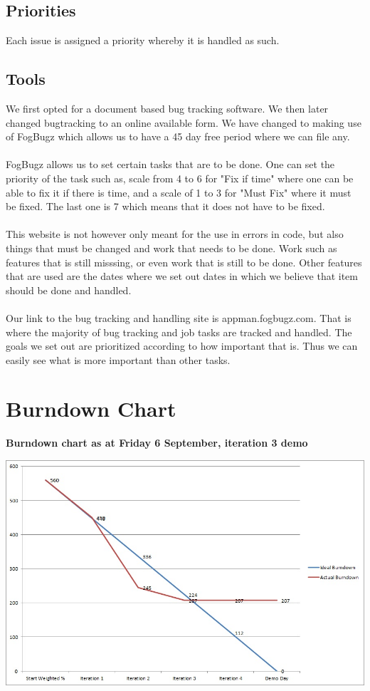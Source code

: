 \documentclass[a4paper,12pt,final]{article}
\begin{document}
\subsection{Priorities}
Each issue is assigned a priority whereby it is handled as such. 
\subsection{Tools}
We first opted for a document based bug tracking software. We then later changed bugtracking to an online available form. We have changed to making use of FogBugz which allows us to have a 45 day free period where we can file any.\\
\textbf{\\}
FogBugz allows us to set certain tasks that are to be done. One can set the priority of the task such as, scale from 4 to 6 for "Fix if time" where one can be able to fix it if there is time, and a scale of 1 to 3 for "Must Fix" where it must be fixed. The last one is 7 which means that it does not have to be fixed.\\
\textbf{\\}
This website is not however only meant for the use in errors in code, but also things that must be changed and work that needs to be done. Work such as features that is still misssing, or even work that is still to be done. Other features that are used are the dates where we set out dates in which we believe that item should be done and handled.\\
\textbf{\\}
Our link to the bug tracking and handling site is appman.fogbugz.com. That is where the majority of bug tracking and job tasks are tracked and handled. The goals we set out are prioritized according to how important that is. Thus we can easily see what is more important than other tasks. 

\newpage
\section{Burndown Chart}
\begin{center}
\textbf{Burndown chart as at Friday 6 September, iteration 3 demo\\}
\end{center}
\begin{center}
\includegraphics[scale=0.7]{Burndown.jpg}
\end{center}
\end{document}

